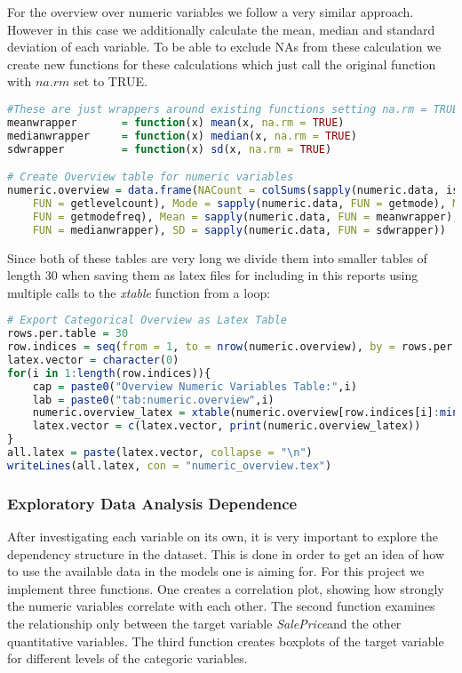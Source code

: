 For the overview over numeric variables we follow a very similar approach. However in this case we additionally calculate the mean, median and standard deviation of each variable. To be able to exclude NAs from these calculation we create new functions for these calculations which just call the original function with $na.rm$ set to TRUE.
\begin{lstlisting}[language=R]
#These are just wrappers around existing functions setting na.rm = TRUE
meanwrapper       = function(x) mean(x, na.rm = TRUE)
medianwrapper     = function(x) median(x, na.rm = TRUE)
sdwrapper         = function(x) sd(x, na.rm = TRUE)

# Create Overview table for numeric variables
numeric.overview = data.frame(NACount = colSums(sapply(numeric.data, is.na)), LevelCount = sapply(numeric.data, 
    FUN = getlevelcount), Mode = sapply(numeric.data, FUN = getmode), ModeFrequency = sapply(numeric.data, 
    FUN = getmodefreq), Mean = sapply(numeric.data, FUN = meanwrapper), Median = sapply(numeric.data, 
    FUN = medianwrapper), SD = sapply(numeric.data, FUN = sdwrapper))
\end{lstlisting} 
Since both of these tables are very long we divide them into smaller tables of length 30 when saving them as latex files for including in this reports using multiple calls to the \textit{xtable} function from a loop:
\begin{lstlisting}[language=R]
# Export Categorical Overview as Latex Table
rows.per.table = 30
row.indices = seq(from = 1, to = nrow(numeric.overview), by = rows.per.table)
latex.vector = character(0)
for(i in 1:length(row.indices)){
    cap = paste0("Overview Numeric Variables Table:",i)
    lab = paste0("tab:numeric.overview",i)
    numeric.overview_latex = xtable(numeric.overview[row.indices[i]:min(row.indices[i] + rows.per.table - 1, nrow(numeric.overview)),,drop = FALSE], caption = cap, label =lab)
    latex.vector = c(latex.vector, print(numeric.overview_latex))
}
all.latex = paste(latex.vector, collapse = "\n")
writeLines(all.latex, con = "numeric_overview.tex")
\end{lstlisting} 


\subsubsection{Exploratory Data Analysis Dependence}
After investigating each variable on its own, it is very important to explore the dependency structure in the dataset. This is done in order to get an idea of how to use the available data in the models one is aiming for. For this project we implement three functions. One creates a correlation plot, showing how strongly the numeric variables correlate with each other. The second function examines the relationship only between the target variable \textit{SalePrice}and the other quantitative variables. The third function creates boxplots of  the target variable for different levels of the categoric variables. 

